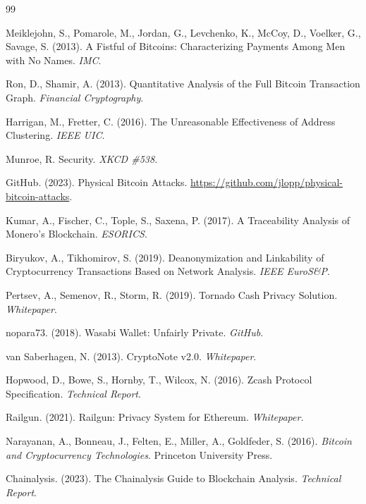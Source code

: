 \documentclass[11pt]{article}
\theoremstyle{definition}
\theoremstyle{plain}
\theoremstyle{remark}
\begin{document}
\begin{thebibliography}{99}

Meiklejohn, S., Pomarole, M., Jordan, G., Levchenko, K., McCoy, D., Voelker, G., Savage, S. (2013). A Fistful of Bitcoins: Characterizing Payments Among Men with No Names. \textit{IMC}.

Ron, D., Shamir, A. (2013). Quantitative Analysis of the Full Bitcoin Transaction Graph. \textit{Financial Cryptography}.

Harrigan, M., Fretter, C. (2016). The Unreasonable Effectiveness of Address Clustering. \textit{IEEE UIC}.

Munroe, R. Security. \textit{XKCD \#538}.

GitHub. (2023). Physical Bitcoin Attacks. \url{https://github.com/jlopp/physical-bitcoin-attacks}.

Kumar, A., Fischer, C., Tople, S., Saxena, P. (2017). A Traceability Analysis of Monero's Blockchain. \textit{ESORICS}.

Biryukov, A., Tikhomirov, S. (2019). Deanonymization and Linkability of Cryptocurrency Transactions Based on Network Analysis. \textit{IEEE EuroS\&P}.

Pertsev, A., Semenov, R., Storm, R. (2019). Tornado Cash Privacy Solution. \textit{Whitepaper}.

nopara73. (2018). Wasabi Wallet: Unfairly Private. \textit{GitHub}.

van Saberhagen, N. (2013). CryptoNote v2.0. \textit{Whitepaper}.

Hopwood, D., Bowe, S., Hornby, T., Wilcox, N. (2016). Zcash Protocol Specification. \textit{Technical Report}.

Railgun. (2021). Railgun: Privacy System for Ethereum. \textit{Whitepaper}.

Narayanan, A., Bonneau, J., Felten, E., Miller, A., Goldfeder, S. (2016). \textit{Bitcoin and Cryptocurrency Technologies}. Princeton University Press.

Chainalysis. (2023). The Chainalysis Guide to Blockchain Analysis. \textit{Technical Report}.


\end{thebibliography}
\end{document}
